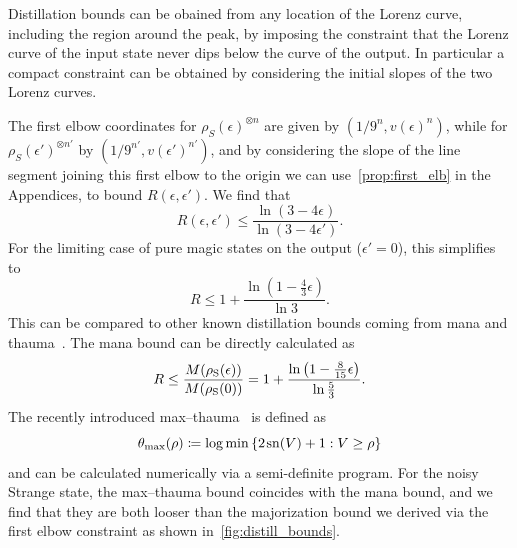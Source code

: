 \documentclass[pra,
aps,
twocolumn,
superscriptaddress,
groupedaddress,
nofootinbib,
reprint
]{revtex4-1}
\begin{document}
Distillation bounds can be obained from any location of the Lorenz curve, including the region around the peak, by imposing the constraint that the Lorenz curve of the input state never dips below the curve of the output. In particular a compact constraint can be obtained by considering the initial slopes of the two Lorenz curves. 

The first elbow coordinates for $\rho_S(\epsilon)^{\otimes n}$ are given by $(1/9^n, v(\epsilon)^n)$, while for $\rho_S(\epsilon')^{\otimes n'}$ by $(1/9^{n'}, v(\epsilon')^{n'})$, and by considering the slope of the line segment joining this first elbow to the origin we can use~\cref{prop:first_elb} in the Appendices, to bound $R(\epsilon, \epsilon')$. We find that
\begin{equation}
	R(\epsilon, \epsilon') \leq \frac{\ln (3-4\epsilon)}{\ln (3-4\epsilon')}.
\end{equation}
For the limiting case of pure magic states on the output ($\epsilon'=0$), this simplifies to
\begin{equation}
	R \leq 1 + \frac{\ln (1 - \frac{4}{3} \epsilon)}{\ln 3}.
\end{equation}
This can be compared to other known distillation bounds coming from mana and thauma~\cite{Wang_2020}. The mana bound can be directly calculated as
\begin{equation}
	R \leq \frac{{M(\rho_{\rm{S}}(\epsilon))}}{{M(\rho_{\rm{S}}(0))}} = 1 + \frac{\ln \left(1 - \frac{8}{15}\epsilon \right)}{\ln \frac{5}{3}}.
\end{equation}
The recently introduced max--thauma~\cite{Wang_2020} is defined as
\begin{equation}
	\theta_{\rm{max}}(\rho) \coloneqq \log{\min{\{2\hspace{1pt} {{\rm{sn}}(V)} +1 : V \geq \rho\}}}
\end{equation}
and can be calculated numerically via a semi-definite program. For the noisy Strange state, the max--thauma bound coincides with the mana bound, and we find that they are both looser than the majorization bound we derived via the first elbow constraint as shown in~\cref{fig:distill_bounds}. 
\end{document}
